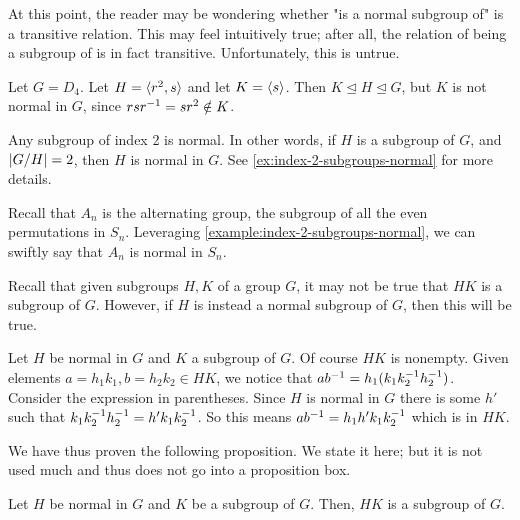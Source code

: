 \documentclass[./main.tex]{subfiles}
\begin{document}
At this point, the reader may be wondering whether "is a normal subgroup of" is
a transitive relation. This may feel intuitively true; after all, the relation
of being a subgroup of is in fact transitive. Unfortunately, this is untrue.

\begin{example}
    Let $G = D_4$. Let $H = { \langle r^2, s \rangle }$ and let $K = { \langle s \rangle }$. Then $K \unlhd
    H \unlhd G$, but $K$ is not normal in $G$, since $rsr^{-1} = sr^2 \notin K$.
\end{example}

\begin{example}
\label{example:index-2-subgroups-normal}
    Any subgroup of index 2 is normal. In other words, if $H$ is a subgroup of
    $G$, and $\abs{G/H} = 2$, then $H$ is normal in $G$. See
    \cref{ex:index-2-subgroups-normal} for more details.
\end{example}

\begin{example}
    Recall that $A_n$ is the alternating group, the subgroup of all the even
    permutations in $S_n$. Leveraging \cref{example:index-2-subgroups-normal},
    we can swiftly say that $A_n$ is normal in $S_n$. 
\end{example}

Recall that given subgroups $H, K$ of a group $G$, it may not be true that $HK$
is a subgroup of $G$. However, if $H$ is instead a normal subgroup of $G$, then
this will be true.

\begin{example}
\label{example:product-of-subgroup-with-normal-subgroup}
    Let $H$ be normal in $G$ and $K$ a subgroup of $G$. Of course $HK$ is
    nonempty. Given elements $a = h_1k_1, b = h_2k_2 \in HK$, we notice that
    $ab^{-1} = h_1 (k_1 k_2 ^{-1} h_2 ^{-1})$. Consider the expression in
    parentheses. Since $H$ is normal in $G$ there is some $h'$ such that $k_1
    k_2^{-1} h_2^{-1} = h' k_1 k_2^{-1}$. So this means $ab^{-1} = h_1 h' k_1
    k_2^{-1}$ which is in $HK$.

    We have thus proven the following proposition. We state it here; but it is
    not used much and thus does not go into a proposition box.
    \begin{center}
        Let $H$ be normal in $G$ and $K$ be a subgroup of $G$. Then, $HK$ is a subgroup of $G$.
    \end{center}
\end{example}
\end{document}
